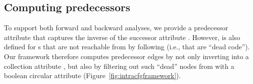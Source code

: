 \subsection{Computing predecessors}

To support both forward and backward analyses, we provide a predecessor attribute that captures the inverse of the successor attribute .
However,  is also defined for s that are not reachable from  by following  (i.e., that are ``dead code'').
Our framework therefore computes predecessor edges  by not only inverting  into a collection attribute , but also by filtering out such ``dead'' nodes from  with a boolean circular attribute  (Figure~\ref{fig:intracfgframework}).
